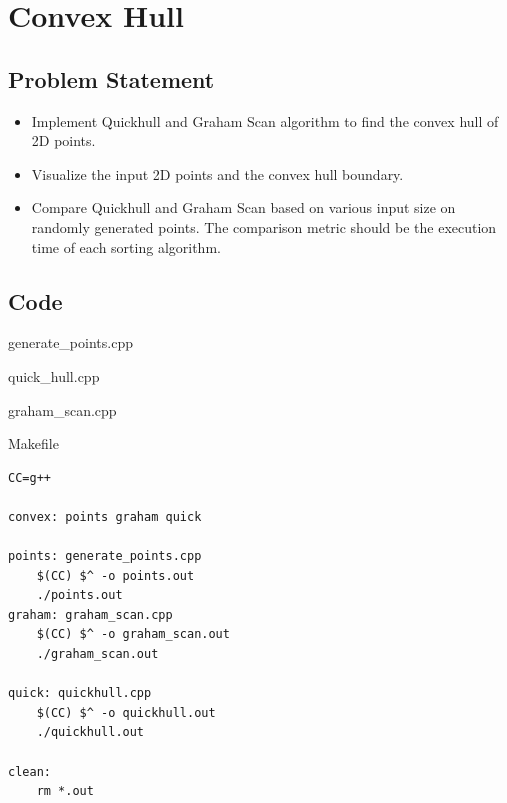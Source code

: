 \section{Convex Hull}
\subsection{Problem Statement}
\begin{itemize}
    \item Implement Quickhull and Graham Scan algorithm to find the convex hull of 2D points. 
    \item Visualize the input 2D points and the convex hull boundary. 
    \item Compare Quickhull and Graham Scan based on various input size on randomly
        generated points.  The comparison metric should be the execution time of 
        each sorting algorithm.
\end{itemize}
\subsection{Code}
\begin{code}
    \caption{generate\_points.cpp}
    \label{code:points}
\end{code}
\begin{code}
    \caption{quick\_hull.cpp}
    \label{code:quickhull}
\end{code}

\begin{code}
    \caption{graham\_scan.cpp}
    \label{code:graham}
\end{code}
\begin{code}
    \caption{Makefile}
\begin{verbatim}
CC=g++

convex: points graham quick

points: generate_points.cpp
	$(CC) $^ -o points.out
	./points.out
graham:	graham_scan.cpp
	$(CC) $^ -o graham_scan.out
	./graham_scan.out

quick: quickhull.cpp
	$(CC) $^ -o quickhull.out
	./quickhull.out

clean:
	rm *.out
    \end{verbatim}
\end{code}


